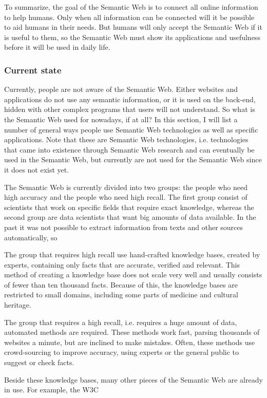\documentclass{article}
\begin{document}
 To summarize, the goal of the Semantic Web is to connect all online information to help humans. Only when all information can be connected will it be possible to aid humans in their needs. But humans will only accept the Semantic Web if it is useful to them, so the Semantic Web must show its applications and usefulness before it will be used in daily life.
 \subsubsection{Current state}
 Currently, people are not aware of the Semantic Web. Either websites and applications do not use any semantic information, or it is used on the back-end, hidden with other complex programs that users will not understand. So what is the Semantic Web used for nowadays, if at all? In this section, I will list a number of general ways people use Semantic Web technologies as well as specific applications. Note that these are Semantic Web technologies, i.e. technologies that came into existence through Semantic Web research and can eventually be used in the Semantic Web, but currently are not used for the Semantic Web since it does not exist yet.
 
 The Semantic Web is currently divided into two groups: the people who need high accuracy and the people who need high recall. The first group consist of scientists that work on specific fields that require exact knowledge, whereas the second group are data scientists that want big amounts of data available. In the past it was not possible to extract information from texts and other sources automatically, so 
 
 The group that requires high recall use hand-crafted knowledge bases, created by experts, containing only facts that are accurate, verified and relevant. This method of creating a knowledge base does not scale very well and usually consists of fewer than ten thousand facts. Because of this, the knowledge bases are restricted to small domains, including some parts of medicine and cultural heritage. \cite{byrne, le2002}
 
 The group that requires a high recall, i.e. requires a huge amount of data, automated methods are required. These methods work fast, parsing thousands of websites a minute, but are inclined to make mistakes. Often, these methods use crowd-sourcing to improve accuracy, using experts or the general public to suggest or check facts. \cite{zhou2007}
 
 Beside these knowledge bases, many other pieces of the Semantic Web are already in use. For example, the W3C \cite{rdf, owl}
 
\end{document}
